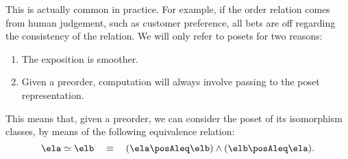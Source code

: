This is actually common in practice.
For example, if the order relation comes from human judgement, such as customer preference, all bets are off regarding the consistency of the relation.
We will only refer to posets for two reasons:
\begin{enumerate}
  \item The exposition is smoother.
  \item Given a preorder, computation will always involve passing to the poset representation.
\end{enumerate}
This means that, given a preorder, we can consider the poset of its isomorphism classes, by means of the following equivalence relation:
\begin{equation}
  \ela \simeq \elb \quad \equiv \quad (\ela \posAleq \elb) \wedge (\elb \posAleq \ela).
\end{equation}

